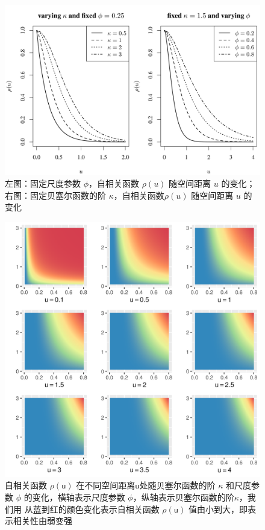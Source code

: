 \documentclass[12pt,a4paper,UTF8,twoside]{book}
\theoremstyle{definition}
\theoremstyle{definition}
\theoremstyle{definition}
\theoremstyle{remark}
\begin{document}
\begin{figure}

{\centering \includegraphics[width=0.8\linewidth]{figures/matern} 

}

\caption{左图：固定尺度参数 $\phi$，自相关函数 $\rho(u)$ 随空间距离 $u$ 的变化；右图：固定贝塞尔函数的阶 $\kappa$，自相关函数$\rho(u)$ 随空间距离 $u$ 的变化}\label{fig:matern-2d}
\end{figure}
\begin{figure}

{\centering \includegraphics[width=0.8\linewidth]{figures/matern-3d} 

}

\caption{自相关函数 $\rho(\mathsf{u})$ 在不同空间距离$\mathsf{u}$处随贝塞尔函数的阶 $\kappa$ 和尺度参数 $\phi$ 的变化，横轴表示尺度参数 $\phi$，纵轴表示贝塞尔函数的阶$\kappa$，我们用 从蓝到红的颜色变化表示自相关函数 $\rho(\mathsf{u})$ 值由小到大，即表示相关性由弱变强}\label{fig:matern-3d}
\end{figure}
\end{document}
